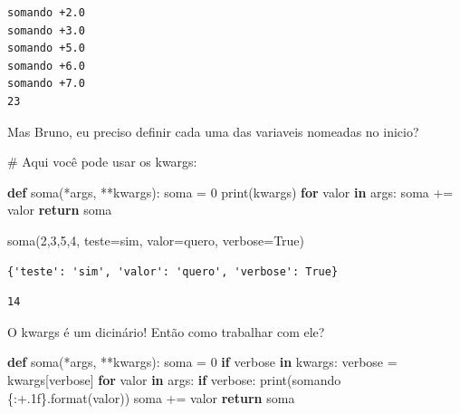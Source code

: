 \documentclass[
  letterpaper,
  DIV=11,
  numbers=noendperiod]{scrreprt}
\newenvironment{Shaded}{\begin{snugshade}}{\end{snugshade}}
\newcommand{\BuiltInTok}[1]{\textcolor[rgb]{0.00,0.23,0.31}{#1}}
\newcommand{\CommentTok}[1]{\textcolor[rgb]{0.37,0.37,0.37}{#1}}
\newcommand{\ControlFlowTok}[1]{\textcolor[rgb]{0.00,0.23,0.31}{\textbf{#1}}}
\newcommand{\DecValTok}[1]{\textcolor[rgb]{0.68,0.00,0.00}{#1}}
\newcommand{\KeywordTok}[1]{\textcolor[rgb]{0.00,0.23,0.31}{\textbf{#1}}}
\newcommand{\NormalTok}[1]{\textcolor[rgb]{0.00,0.23,0.31}{#1}}
\newcommand{\OperatorTok}[1]{\textcolor[rgb]{0.37,0.37,0.37}{#1}}
\newcommand{\SpecialCharTok}[1]{\textcolor[rgb]{0.37,0.37,0.37}{#1}}
\newcommand{\StringTok}[1]{\textcolor[rgb]{0.13,0.47,0.30}{#1}}
\newcommand{\VariableTok}[1]{\textcolor[rgb]{0.07,0.07,0.07}{#1}}
\begin{document}
\begin{verbatim}
somando +2.0
somando +3.0
somando +5.0
somando +6.0
somando +7.0
23
\end{verbatim}

Mas Bruno, eu preciso definir cada uma das variaveis nomeadas no inicio?

\begin{Shaded}
\begin{Highlighting}[]
\CommentTok{\# Aqui você pode usar os kwargs:}

\KeywordTok{def}\NormalTok{ soma(}\OperatorTok{*}\NormalTok{args, }\OperatorTok{**}\NormalTok{kwargs):}
\NormalTok{    soma }\OperatorTok{=} \DecValTok{0}
    \BuiltInTok{print}\NormalTok{(kwargs)}
    \ControlFlowTok{for}\NormalTok{ valor }\KeywordTok{in}\NormalTok{ args:}
\NormalTok{        soma }\OperatorTok{+=}\NormalTok{ valor}
    \ControlFlowTok{return}\NormalTok{ soma}
\end{Highlighting}
\end{Shaded}

\begin{Shaded}
\begin{Highlighting}[]
\NormalTok{soma(}\DecValTok{2}\NormalTok{,}\DecValTok{3}\NormalTok{,}\DecValTok{5}\NormalTok{,}\DecValTok{4}\NormalTok{, teste}\OperatorTok{=}\StringTok{\textquotesingle{}sim\textquotesingle{}}\NormalTok{, valor}\OperatorTok{=}\StringTok{\textquotesingle{}quero\textquotesingle{}}\NormalTok{, verbose}\OperatorTok{=}\VariableTok{True}\NormalTok{)}
\end{Highlighting}
\end{Shaded}

\begin{verbatim}
{'teste': 'sim', 'valor': 'quero', 'verbose': True}
\end{verbatim}

\begin{verbatim}
14
\end{verbatim}

O kwargs é um dicinário! Então como trabalhar com ele?

\begin{Shaded}
\begin{Highlighting}[]
\KeywordTok{def}\NormalTok{ soma(}\OperatorTok{*}\NormalTok{args, }\OperatorTok{**}\NormalTok{kwargs):}
\NormalTok{    soma }\OperatorTok{=} \DecValTok{0}
    \ControlFlowTok{if} \StringTok{\textquotesingle{}verbose\textquotesingle{}} \KeywordTok{in}\NormalTok{ kwargs:}
\NormalTok{        verbose }\OperatorTok{=}\NormalTok{ kwargs[}\StringTok{\textquotesingle{}verbose\textquotesingle{}}\NormalTok{]}
    \ControlFlowTok{for}\NormalTok{ valor }\KeywordTok{in}\NormalTok{ args:}
        \ControlFlowTok{if}\NormalTok{ verbose:}
            \BuiltInTok{print}\NormalTok{(}\StringTok{\textquotesingle{}somando }\SpecialCharTok{\{:+.1f\}}\StringTok{\textquotesingle{}}\NormalTok{.}\BuiltInTok{format}\NormalTok{(valor))}
\NormalTok{        soma }\OperatorTok{+=}\NormalTok{ valor}
    \ControlFlowTok{return}\NormalTok{ soma}
\end{Highlighting}
\end{Shaded}
\end{document}
